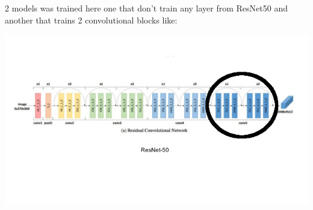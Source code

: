 \documentclass[11pt]{article}
\begin{document}
2 models was trained here one that don't train any layer from ResNet50 and
another that trains 2 convolutional blocks like:

\begin{center}
\includegraphics[width=.9\linewidth]{./images/resnet50.jpg}
\end{center}


\pagebreak
\end{document}
